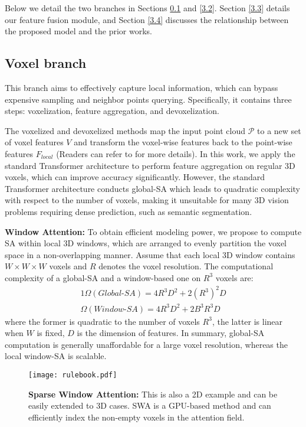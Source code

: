 \documentclass[10pt,twocolumn,letterpaper]{article}
\begin{document}
Below we detail the two branches in Sections \ref{section3.1} and \ref{3.2}. Section \ref{3.3} details our feature fusion module, and Section \ref{3.4} discusses the relationship between the proposed model and the prior works.

\subsection{Voxel branch} \label{section3.1}
This branch aims to effectively capture local information, which can bypass expensive sampling and neighbor points querying. Specifically, it contains three steps: voxelization, feature aggregation, and devoxelization.

The voxelized and devoxelized methods map the input point cloud $\mathcal{P}$ to a new set of voxel features $V$ and transform the voxel-wise features back to the point-wise features $F_{local}$ (Readers can refer to \cite{2019Point} for more details). In this work, we apply the standard Transformer architecture \cite{2017Attention} to perform feature aggregation on regular 3D voxels, which can improve accuracy significantly. However, the standard Transformer architecture conducts global-SA which leads to quadratic complexity with respect to the number of voxels, making it unsuitable for many 3D vision problems requiring dense prediction, such as semantic segmentation.

\textbf{Window Attention:} To obtain efficient modeling power, we propose to compute SA within local 3D windows, which are arranged to evenly partition the voxel space in a non-overlapping manner. Assume that each local 3D window contains $W\times W\times W$ voxels and $R$ denotes the voxel resolution. The computational complexity of a global-SA and a window-based one on $R^3$ voxels are:
\begin{alignat}{1}
    \Omega(Global\textbf{-}SA)=4R^3D^2+2(R^3)^2D \\
    \Omega(Window\textbf{-}SA)=4R^3D^2+2B^3R^3D
\end{alignat}
where the former is quadratic to the number of voxels $R^3$, the latter is linear when $W$ is fixed, $D$ is the dimension of features. In summary, global-SA computation is generally unaffordable for a large voxel resolution, whereas the local window-SA is scalable.

\begin{figure}
    \centering
    \texttt{[image: rulebook.pdf]}
    \caption{\textbf{Sparse Window Attention: }This is also a 2D example and can be easily extended to 3D cases. SWA is a GPU-based method and can efficiently index the non-empty voxels in the attention field.}
    \label{SWA}
\end{figure}
\end{document}
